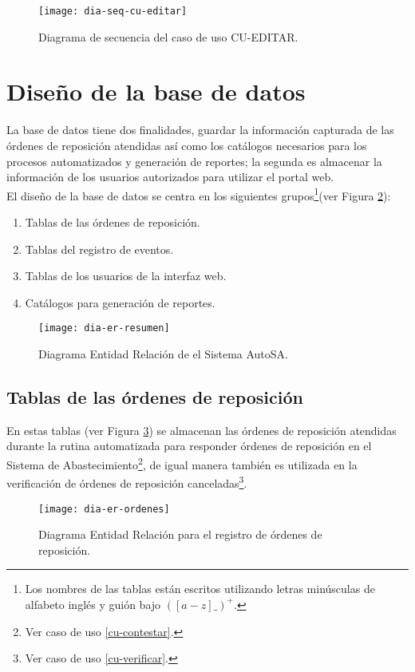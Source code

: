 \begin{figure}[h]
	\centering
	\texttt{[image: dia-seq-cu-editar]}
	\caption{Diagrama de secuencia del caso de uso CU-EDITAR.}
	\label{fig:dia-seq-cu-editar}
\end{figure}



\newpage
\section{Diseño de la base de datos}
La base de datos tiene dos finalidades, guardar la información capturada de las órdenes de reposición atendidas así como los catálogos necesarios para los procesos automatizados y generación de reportes; la segunda es almacenar la información de los usuarios autorizados para utilizar el portal web.\\
El diseño de la base de datos se centra en los siguientes grupos\footnote{Los nombres de las tablas están escritos utilizando letras minúsculas de alfabeto inglés y guión bajo $([a-z]{\_})^+$.}(ver Figura \ref{fig:dia-er-resumen}):
\begin{enumerate}
	\item Tablas de las órdenes de reposición.
	\item Tablas del registro de eventos.
	\item Tablas de los usuarios de la interfaz web.
	\item Catálogos para generación de reportes.
\end{enumerate}
\begin{figure}[h]
  \centering
  \texttt{[image: dia-er-resumen]}
  \caption{Diagrama Entidad Relación de el Sistema AutoSA.}
  \label{fig:dia-er-resumen}
\end{figure}


\subsection{Tablas de las órdenes de reposición}
En estas tablas (ver Figura \ref{fig:dia-er-ordenes}) se almacenan las órdenes de reposición atendidas durante la rutina automatizada para responder órdenes de reposición en el Sistema de Abastecimiento\footnote{Ver caso de uso \ref{cu-contestar}.}, de igual manera también es utilizada en la verificación de órdenes de reposición canceladas\footnote{Ver caso de uso \ref{cu-verificar}.}.
\begin{figure}[h]
  \centering
  \texttt{[image: dia-er-ordenes]} 
  \caption{Diagrama Entidad Relación para el registro de órdenes de reposición.}
  \label{fig:dia-er-ordenes}
\end{figure}
